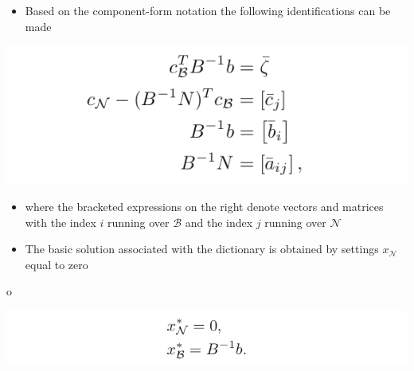 \documentclass[11pt]{article}
\begin{document}
\begin{itemize}
\item Based on the component-form notation the following identifications can be made
\end{itemize}
\begin{center}
\includegraphics[width=.9\linewidth]{The Simplex Method in Matrix Notation/screenshot_2019-02-11_16-29-26.png}
\end{center}
\begin{itemize}
\item where the bracketed expressions on the right denote vectors and matrices with the index \(i\) running over \(\mathcal B\) and the index \(j\) running over \(\mathcal N\)
\item The basic solution associated with the dictionary is obtained by settings \(x_{\mathcal N}\) equal to zero
\end{itemize}
o\begin{center}
\includegraphics[width=.9\linewidth]{The Simplex Method in Matrix Notation/screenshot_2019-02-11_16-33-51.png}
\end{center}
\end{document}
